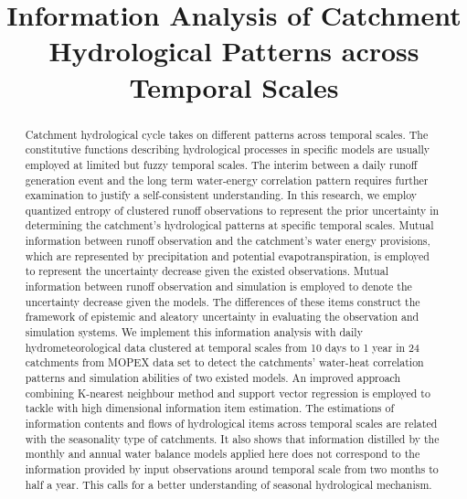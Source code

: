 \documentclass[11pt]{article}
\begin{document}

\title{Information Analysis of Catchment Hydrological Patterns across Temporal Scales}
\date{ }
\maketitle

\newpage
\begin{abstract}
Catchment hydrological cycle takes on different patterns across temporal scales. 
The constitutive functions describing hydrological processes in specific models are usually employed at limited but fuzzy temporal scales.
The interim between a daily runoff generation event and the long term water-energy correlation pattern requires further examination to justify a self-consistent understanding.
In this research, we employ quantized entropy of clustered runoff observations to represent the prior uncertainty in determining the catchment's hydrological patterns at specific temporal scales. Mutual information between runoff observation and the catchment's water  energy provisions, which are represented by precipitation and potential evapotranspiration, is employed to represent the uncertainty decrease given the existed observations. Mutual information between runoff observation and simulation is employed to denote the uncertainty decrease given the models. The differences of these items construct the framework of epistemic and aleatory uncertainty in evaluating the observation and simulation systems. We implement this information analysis with daily hydrometeorological data clustered at temporal scales from 10 days to 1 year in 24 catchments from  MOPEX data set to detect the catchments' water-heat correlation patterns and simulation abilities of two existed models.  An improved approach combining K-nearest neighbour method and  support vector regression is employed to tackle with high dimensional information item estimation. 
The estimations of information contents and flows of hydrological items across temporal scales are related with the seasonality type of catchments. It also shows that information distilled by the monthly and annual water balance models applied here does not correspond to the information provided by input observations around temporal scale from two months to half a year. This calls for a better understanding of seasonal hydrological mechanism.








\end{abstract}
\end{document}
